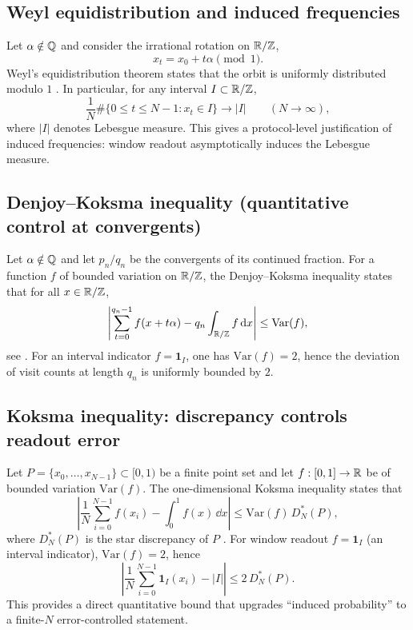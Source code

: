 \subsection{Weyl equidistribution and induced frequencies}
\label{app:weyl_equidistribution}

Let $\alpha\notin\mathbb{Q}$ and consider the irrational rotation on $\mathbb{R}/\mathbb{Z}$,
\begin{equation}
x_t = x_0 + t\alpha \pmod 1.
\end{equation}
Weyl's equidistribution theorem states that the orbit is uniformly distributed modulo $1$ \cite{Weyl1916,KuipersNiederreiter1974}. In particular, for any interval $I\subset \mathbb{R}/\mathbb{Z}$,
\begin{equation}
\frac{1}{N}\#\{0\le t\le N-1: x_t\in I\}\to |I|\qquad (N\to\infty),
\end{equation}
where $|I|$ denotes Lebesgue measure. This gives a protocol-level justification of induced frequencies: window readout asymptotically induces the Lebesgue measure.

\subsection{Denjoy--Koksma inequality (quantitative control at convergents)}
\label{app:denjoy_koksma}

Let $\alpha\notin\mathbb{Q}$ and let $p_n/q_n$ be the convergents of its continued fraction. For a function $f$ of bounded variation on $\mathbb{R}/\mathbb{Z}$, the Denjoy--Koksma inequality states that for all $x\in\mathbb{R}/\mathbb{Z}$,
\begin{equation}
\left|\sum_{t=0}^{q_n-1} f(x+t\alpha) - q_n\int_{\mathbb{R}/\mathbb{Z}} f\,\mathrm{d} x\right|
\le \mathrm{Var}(f),
\end{equation}
see \cite{Denjoy1932,Koksma1935,KatokHasselblatt1995}. For an interval indicator $f=\mathbf{1}_I$, one has $\mathrm{Var}(f)=2$, hence the deviation of visit counts at length $q_n$ is uniformly bounded by $2$.

\subsection{Koksma inequality: discrepancy controls readout error}
\label{app:koksma_inequality}

Let $P=\{x_0,\ldots,x_{N-1}\}\subset[0,1)$ be a finite point set and let $f:[0,1]\to\mathbb{R}$ be of bounded variation $\mathrm{Var}(f)$. The one-dimensional Koksma inequality states that
\begin{equation}
\left|\frac{1}{N}\sum_{i=0}^{N-1} f(x_i) - \int_0^1 f(x)\,\dd x\right|
\le \mathrm{Var}(f)\, D_N^\ast(P),
\end{equation}
where $D_N^\ast(P)$ is the star discrepancy of $P$ \cite{KuipersNiederreiter1974}.
For window readout $f=\mathbf{1}_I$ (an interval indicator), $\mathrm{Var}(f)=2$, hence
\begin{equation}
\left|\frac{1}{N}\sum_{i=0}^{N-1} \mathbf{1}_I(x_i) - |I|\right|\le 2\, D_N^\ast(P).
\end{equation}
This provides a direct quantitative bound that upgrades ``induced probability'' to a finite-$N$ error-controlled statement.

